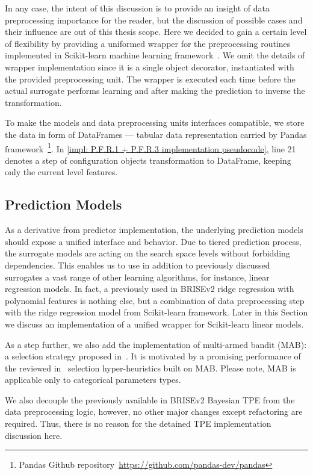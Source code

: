 In any case, the intent of this discussion is to provide an insight of data preprocessing importance for the reader, but the discussion of possible cases and their influence are out of this thesis scope. Here we decided to gain a certain level of flexibility by providing a uniformed wrapper for the preprocessing routines implemented in Scikit-learn machine learning framework~\cite{scikit-learn}. We omit the details of wrapper implementation since it is a single object decorator, instantiated with the provided preprocessing unit. The wrapper is executed each time before the actual surrogate performs learning and after making the prediction to inverse the transformation.

To make the models and data preprocessing units interfaces compatible, we store the data in form of DataFrames --- tabular data representation carried by Pandas framework~\footnote{Pandas Github repository~\url{https://github.com/pandas-dev/pandas}}. In \cref{impl: P.F.R.1 + P.F.R.3 implementation pseudocode}, line 21 denotes a step of configuration objects transformation to DataFrame, keeping only the current level features.


\subsection{Prediction Models}\label{impl: prediction models}
As a derivative from predictor implementation, the underlying prediction models should expose a unified interface and behavior. Due to tiered prediction process, the surrogate models are acting on the search space levels without forbidding dependencies. This enables us to use in addition to previously discussed surrogates a vast range of other learning algorithms, for instance, linear regression models. In fact, a previously used in BRISEv2 ridge regression with polynomial features is nothing else, but a combination of data preprocessing step with the ridge regression model from Scikit-learn framework. Later in this Section we discuss an implementation of a unified wrapper for Scikit-learn linear models.

As a step further, we also add the implementation of multi-armed bandit (MAB): a selection strategy proposed in~\cite{auer2002finite}. It is motivated by a promising performance of the reviewed in~\cite{auer2002finite} selection hyper-heuristics built on MAB. Please note, MAB is applicable only to categorical parameters types.

We also decouple the previously available in BRISEv2 Bayesian TPE from the data preprocessing logic, however, no other major changes except refactoring are required. Thus, there is no reason for the detained TPE implementation discussion here.

